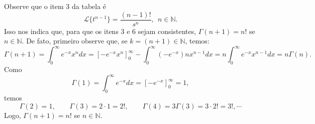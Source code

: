 \documentclass[a4paper,10pt]{book}
\begin{document}
Observe que o item 3 da tabela é
\begin{equation}
\mathcal{L}\{t^{n-1}\}=\frac{(n-1)!}{s^n}, ~~  n\in \mathbb{N}.
\end{equation}
Isso nos indica que, para que os itens 3 e 6 sejam consistentes, $\Gamma(n+1)=n!$ se $n\in\mathbb{N}$. De fato, primeiro observe que, se $k=(n+1)\in\mathbb{N}$, temos:
\begin{equation}
\Gamma(n+1)=\int_0^\infty e^{-x}x^{n}dx=\left[-e^{-x}x^{n}\right]_0^\infty-\int_0^\infty (-e^{-x})nx^{n-1}dx=n\int_0^\infty e^{-x}x^{n-1}dx=n\Gamma(n).
\end{equation}
Como 
\begin{equation}
\Gamma(1)=\int_0^\infty e^{-x}dx=\left[-e^{-x}\right]_0^\infty=1,
\end{equation}
temos
\begin{equation}
\Gamma(2)=1,\qquad \Gamma(3)=2\cdot 1=2!,\qquad \Gamma(4)=3\Gamma(3)=3\cdot 2!=3!,\cdots
\end{equation}
Logo, $\Gamma(n+1)=n!$ se $n\in\mathbb{N}$.
\end{document}
